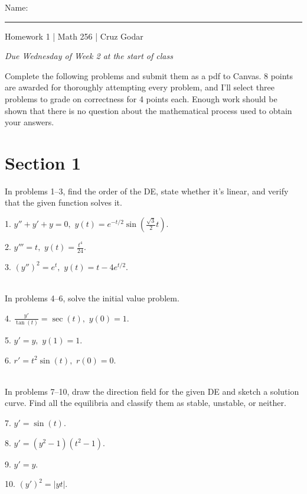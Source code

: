 \documentclass{article}
\begin{document}
\Large Name: \rule{2in}{0.15mm} \hfill Homework 1 | Math 256 | Cruz Godar \vspace{4pt}  \normalsize

\textit{Due Wednesday of Week 2 at the start of class}

Complete the following problems and submit them as a pdf to Canvas. 8 points are awarded for thoroughly attempting every problem, and I'll select three problems to grade on correctness for 4 points each. Enough work should be shown that there is no question about the mathematical process used to obtain your answers.

\section{Section 1}

In problems 1--3, find the order of the DE, state whether it's linear, and verify that the given function solves it.

1. $\displaystyle y'' + y' + y = 0,$ $\displaystyle y(t) = e^{-t / 2}\sin\left( \frac{\sqrt{3}}{2} t \right).$

2. $\displaystyle y''' = t,$ $\displaystyle y(t) = \frac{t^4}{24}.$

3. $\displaystyle (y'')^2 = e^t,$ $\displaystyle y(t) = t - 4e^{t / 2}.$

~\\

In problems 4--6, solve the initial value problem.

4. $\displaystyle \frac{y'}{\tan(t)} = \sec(t),$ $\displaystyle y(0) = 1.$

5. $\displaystyle y' = y,$ $\displaystyle y(1) = 1.$

6. $\displaystyle r' = t^2\sin(t),$ $\displaystyle r(0) = 0.$

~\\

In problems 7--10, draw the direction field for the given DE and sketch a solution curve. Find all the equilibria and classify them as stable, unstable, or neither.

7. $\displaystyle y' = \sin(t).$

8. $\displaystyle y' = (y^2 - 1)(t^2 - 1).$

9. $\displaystyle y' = y.$

10. $\displaystyle (y')^2 = |yt|.$
\end{document}
